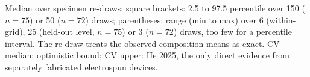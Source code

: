 Median over specimen re-draws; square brackets: 2.5 to 97.5 percentile over 150 ($n = 75$) or 50 ($n = 72$) draws; parentheses: range (min to max) over 6 (within-grid), 25 (held-out level, $n = 75$) or 3 ($n = 72$) draws, too few for a percentile interval. The re-draw treats the observed composition means as exact. CV median: optimistic bound; CV upper: He 2025, the only direct evidence from separately fabricated electrospun devices.
